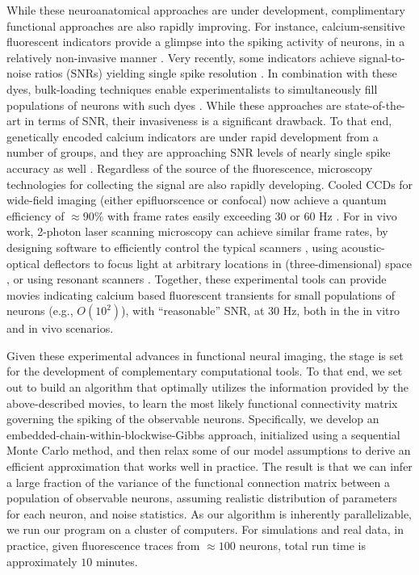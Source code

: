While these neuroanatomical approaches are under development, complimentary functional approaches are also rapidly improving.  For instance, calcium-sensitive fluorescent indicators provide a glimpse into the spiking activity of neurons, in a relatively non-invasive manner \cite{Tsien89}. Very recently, some indicators achieve signal-to-noise ratios (SNRs) yielding single spike resolution \cite{??}.  In combination with these dyes, bulk-loading techniques enable experimentalists to simultaneously fill populations of neurons with such dyes \cite{??}.  While these approaches are state-of-the-art in terms of SNR, their invasiveness is a significant drawback.  To that end, genetically encoded calcium indicators are under rapid development from a number of groups, and they are approaching SNR levels of nearly single spike accuracy as well \cite{??}. Regardless of the source of the fluorescence, microscopy technologies for collecting the signal are also rapidly developing.  Cooled CCDs for wide-field imaging (either epifluorscence or confocal) now achieve a quantum efficiency of $\approx 90 \%$ with frame rates easily exceeding $30$ or $60$ Hz \cite{redshirt}.  For in vivo work, 2-photon laser scanning microscopy can achieve similar frame rates, by designing software to efficiently control the typical scanners \cite{??}, using acoustic-optical deflectors to focus light at arbitrary locations in (three-dimensional) space \cite{??}, or using resonant scanners \cite{??}.  Together, these experimental tools can provide movies indicating calcium based fluorescent transients for small populations of neurons (e.g., $O(10^2)$), with ``reasonable'' SNR, at 30 Hz, both in the in vitro and in vivo scenarios.  

Given these experimental advances in functional neural imaging, the stage is set for the development of complementary computational tools.  To that end, we set out to build an algorithm that optimally utilizes the information provided by the above-described movies, to learn the most likely functional connectivity matrix governing the spiking of the observable neurons.  Specifically, we develop an embedded-chain-within-blockwise-Gibbs approach, initialized using a sequential Monte Carlo method, and then relax some of our model assumptions to derive an efficient approximation that works well in practice.  The result is that we can infer a large fraction of the variance of the functional connection matrix between a population of observable neurons, assuming realistic distribution of parameters for each neuron, and noise statistics.  As our algorithm is inherently parallelizable, we run our program on a cluster of computers.  For simulations and real data, in practice, given fluorescence traces from $\approx 100$ neurons, total run time is approximately $10$ minutes.




